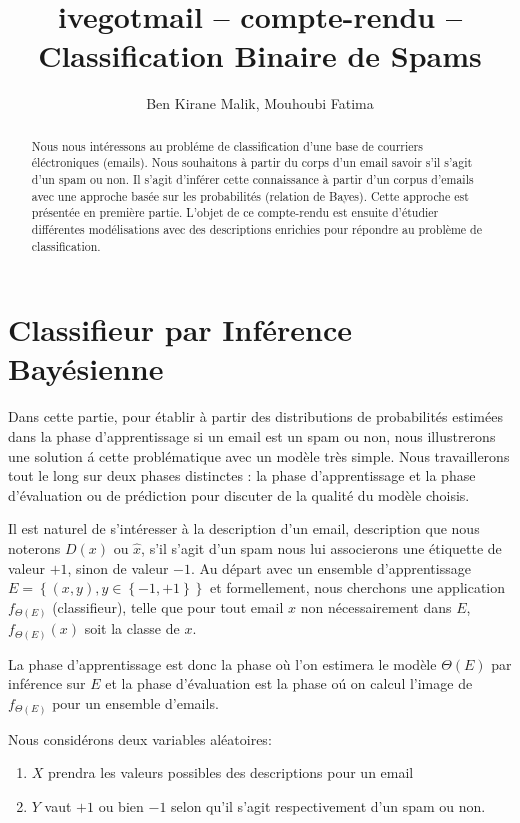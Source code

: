 \documentclass[a4paper, french]{article}
\title{ivegotmail -- compte-rendu --\\ Classification Binaire de Spams}
\author{Ben Kirane Malik, Mouhoubi Fatima}
\begin{document}
\maketitle
\setlength{\parskip}{0.1in}
\setlength{\parindent}{15pt}

\begin{abstract}
Nous nous int\'eressons au probl\'eme de classification d'une base de courriers \'el\'ectroniques (emails). Nous souhaitons \`a partir du corps d'un email savoir s'il s'agit d'un spam ou non. Il s'agit d'inf\'erer cette connaissance \`a partir d'un corpus d'emails avec une approche bas\'ee sur les probabilit\'es (relation de Bayes). Cette approche est  pr\'esent\'ee en premi\`ere partie. L'objet de ce compte-rendu est ensuite d'\'etudier diff\'erentes mod\'elisations avec des descriptions enrichies pour r\'epondre au probl\`eme de classification.
\end{abstract}

\section{Classifieur par Inf\'erence Bay\'esienne}
Dans cette partie, pour \'etablir  \`a partir des distributions de probabilit\'es estim\'ees dans la phase d'apprentissage si un email est un spam ou non, nous illustrerons une solution \'a cette probl\'ematique  avec un mod\`ele tr\`es simple.  
Nous travaillerons tout le long sur deux phases distinctes : la phase d'apprentissage et la phase d'\'evaluation ou de pr\'ediction pour discuter de la qualit\'e du mod\`ele choisis.

Il est naturel de s'int\'eresser \`a la description d'un email, description que nous noterons $D(x)$ ou $\hat{x}$, s'il s'agit d'un spam nous lui associerons une \'etiquette de valeur $+1$, sinon de valeur $-1$. 
Au d\'epart avec un ensemble d'apprentissage $E=\left\{(x,y), y\in \left\{-1,+1\right\}\right\}$ et formellement, nous cherchons une application $f_{\Theta(E)}$  (classifieur), telle que pour tout email $x$ non n\'ecessairement dans $E$, $f_{\Theta(E)}(x)$ soit la classe de $x$. 

La phase d'apprentissage est donc la phase o\`u l'on estimera le mod\`ele  $\Theta(E)$ par inf\'erence sur $E$ et la phase d'\'evaluation est la phase o\'u on calcul l'image de $f_{\Theta(E)}$ pour un ensemble d'emails.

Nous consid\'erons deux variables al\'eatoires:
\begin{enumerate}
\item $X$ prendra les valeurs possibles des descriptions pour un email
\item $Y$ vaut $+1$ ou bien $-1$ selon qu'il s'agit respectivement d'un spam ou non.
\end{enumerate}
\end{document}
